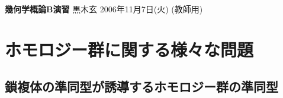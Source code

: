 \documentclass[12pt,twoside]{jarticle}
\newcommand\commentout[1]{#1}
\newcommand\commentout[1]{}
\begin{document}
\noindent
{\Large\bf 幾何学概論B演習}
\hfill
{\large 黒木玄}
\qquad
2006年11月7日(火)
\commentout{\quad (教師用)}

\tableofcontents



\section{ホモロジー群に関する様々な問題}


\subsection{鎖複体の準同型が誘導するホモロジー群の準同型}

%
\end{document}
